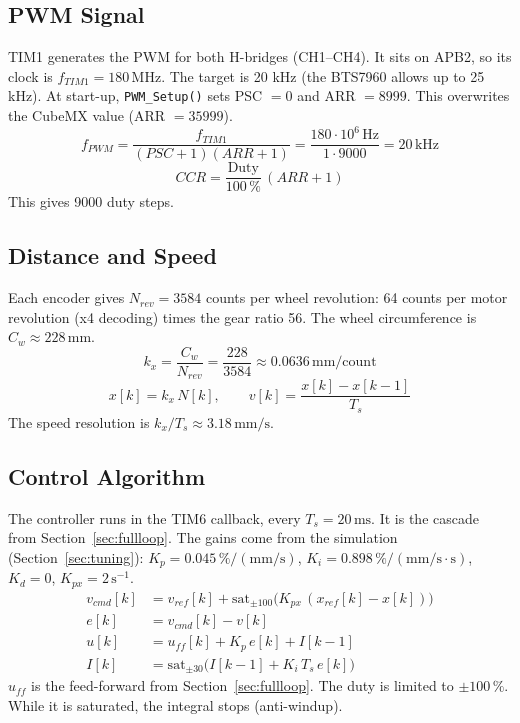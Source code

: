 \documentclass[11pt,a4paper]{article}
\begin{document}
\subsection{PWM Signal}
TIM1 generates the PWM for both H-bridges (CH1--CH4).
It sits on APB2, so its clock is \(f_{TIM1} = 180\,\mathrm{MHz}\).
The target is 20 kHz (the BTS7960 allows up to 25 kHz).
At start-up, \texttt{PWM\_Setup()} sets PSC \(= 0\) and ARR \(= 8999\).
This overwrites the CubeMX value (ARR \(= 35999\)).
\begin{equation}
  f_{PWM} = \frac{f_{TIM1}}{(PSC+1)(ARR+1)} = \frac{180\cdot 10^6\,\mathrm{Hz}}{1 \cdot 9000} = 20\,\mathrm{kHz}
\end{equation}
\begin{equation}
  CCR = \frac{\text{Duty}}{100\,\%}\,(ARR+1)
\end{equation}
This gives 9000 duty steps.

\subsection{Distance and Speed}
Each encoder gives \(N_{rev} = 3584\) counts per wheel revolution:
64 counts per motor revolution (x4 decoding) times the gear ratio 56.
The wheel circumference is \(C_w \approx 228\,\mathrm{mm}\).
\begin{equation}
  k_x = \frac{C_w}{N_{rev}} = \frac{228}{3584} \approx 0.0636\,\mathrm{mm/count}
\end{equation}
\begin{equation}
  x[k] = k_x\,N[k],
  \qquad
  v[k] = \frac{x[k] - x[k-1]}{T_s}
\end{equation}
The speed resolution is \(k_x / T_s \approx 3.18\,\mathrm{mm/s}\).

\subsection{Control Algorithm}
The controller runs in the TIM6 callback, every \(T_s = 20\,\mathrm{ms}\).
It is the cascade from Section~\ref{sec:fullloop}.
The gains come from the simulation (Section~\ref{sec:tuning}):
\(K_p = 0.045\,\%/(\mathrm{mm/s})\), \(K_i = 0.898\,\%/(\mathrm{mm/s\cdot s})\), \(K_d = 0\),
\(K_{px} = 2\,\mathrm{s^{-1}}\).
\begin{align}
  v_{cmd}[k] &= v_{ref}[k] + \mathrm{sat}_{\pm 100}\bigl(K_{px}\,(x_{ref}[k] - x[k])\bigr) \\
  e[k]       &= v_{cmd}[k] - v[k] \\
  u[k]       &= u_{ff}[k] + K_p\,e[k] + I[k-1] \\
  I[k]       &= \mathrm{sat}_{\pm 30}\bigl(I[k-1] + K_i\,T_s\,e[k]\bigr)
\end{align}
\(u_{ff}\) is the feed-forward from Section~\ref{sec:fullloop}.
The duty is limited to \(\pm 100\,\%\).
While it is saturated, the integral stops (anti-windup).
\end{document}
